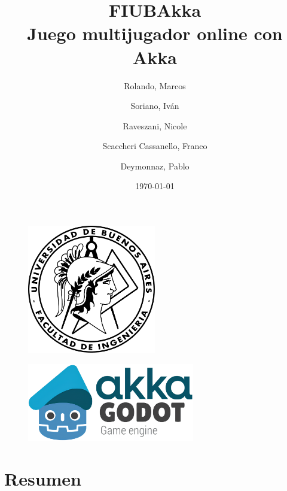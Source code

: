 \documentclass[11pt]{article}
\begin{document}
\title{\textbf{FIUBAkka} \\ \large \textbf{Juego multijugador online con Akka}}
\author{
    Rolando, Marcos
    \and
    Soriano, Iván
    \and
    Raveszani, Nicole
    \and
    Scaccheri Cassanello, Franco
    \and
    Deymonnaz, Pablo
}
\date{\today}

\maketitle %

\thispagestyle{empty}

\begin{figure}[htbp]
    \centering
    \includegraphics[width=0.5\textwidth]{../assets/fiuba-logo.png}
\end{figure}
\begin{figure}[htbp]
  \centering
  \includegraphics[width=0.65\textwidth]{../assets/fiubakka-logo.png}
\end{figure}

\newpage
\thispagestyle{empty}
\tableofcontents
\thispagestyle{empty}
\newpage

\setcounter{page}{1} %

\section{Resumen}


\end{document}
